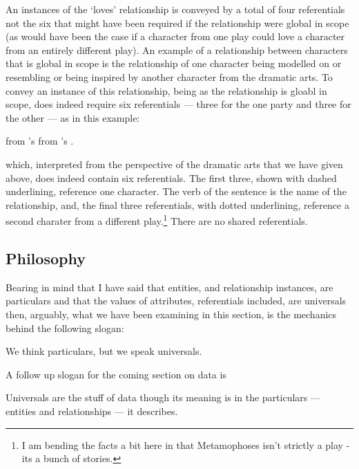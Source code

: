 An instances of the `loves' relationship is conveyed by a total of four referentials
 not the six that might have been required
if the relationship were global in scope (as would have been the case if a
 character from one play could love  a character from an entirely different play).
 An example of a relationship between characters that is global in scope 
 is the relationship of one character being modelled on or resembling or being inspired 
 by another character from the dramatic arts.
 To convey an instance of this relationship, being as the relationship is gloabl in scope,  does indeed require
 six referentials --- three for the one party and three for the other --- as in this example:
\begin{erquote}
\parbox{9.0cm}{\linespread{1.3}\normalsize
{} from 's 
            from 's .}
\end{erquote}
which, interpreted from the perspective of the dramatic arts that we have given above, does indeed contain six referentials. 
The first three, shown with dashed underlining, reference one character.
The verb of the sentence is the name of the relationship, and, 
the final three referentials, with dotted underlining, 
reference a second charater from a different play.\footnote{I am bending the facts a bit here 
in that Metamophoses isn't strictly a play - its a bunch of stories.} 
There are no shared referentials.


\subsection{Philosophy}
\mynote
Bearing in mind that I have said that entities, and relationship instances, are particulars
and that the values of attributes, referentials included, are universals then, arguably,
 what we have been examining in this section, 
 is the mechanics behind the following slogan:
\begin{erquote}
We think particulars, but we speak universals.
\end{erquote}
\begin{noteforfuture}
\mynote
A follow up slogan for the coming section on data is
\begin{erquote}
Universals are the stuff of data though its meaning is in the 
particulars --- entities and relationships --- it describes. 
\end{erquote}
\end{noteforfuture}





 
